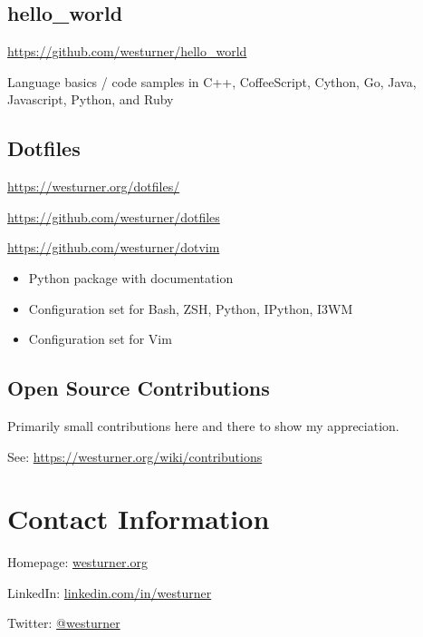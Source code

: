 \documentclass[letter,,openany,oneside]{sphinxhowto}
\begin{document}
\subsection{hello\_world}
\label{resume:hello-world}
\begin{DUlineblock}{0em}
\item[] \href{https://github.com/westurner/hello\_world}{https://github.com/westurner/hello\_world}
\end{DUlineblock}

Language basics / code samples in C++, CoffeeScript, Cython,
Go, Java, Javascript, Python, and Ruby


\subsection{Dotfiles}
\label{resume:dotfiles}
\begin{DUlineblock}{0em}
\item[] \href{https://westurner.org/dotfiles/}{https://westurner.org/dotfiles/}
\item[] \href{https://github.com/westurner/dotfiles}{https://github.com/westurner/dotfiles}
\item[] \href{https://github.com/westurner/dotvim}{https://github.com/westurner/dotvim}
\end{DUlineblock}
\begin{itemize}
\item {} 
Python package with documentation

\item {} 
Configuration set for Bash, ZSH, Python, IPython, I3WM

\item {} 
Configuration set for Vim

\end{itemize}


\subsection{Open Source Contributions}
\label{resume:open-source-contributions}
Primarily small contributions here and there to show my appreciation.

See: \href{https://westurner.org/wiki/contributions}{https://westurner.org/wiki/contributions}


\section{Contact Information}
\label{resume:contact-information}
\begin{DUlineblock}{0em}
\item[] Homepage: \href{https://westurner.org}{westurner.org}
\item[] LinkedIn: \href{http://www.linkedin.com/in/westurner}{linkedin.com/in/westurner}
\item[] Twitter: \href{https://twitter.com/westurner}{@westurner}
\end{DUlineblock}



\renewcommand{\indexname}{Index}
\end{document}
